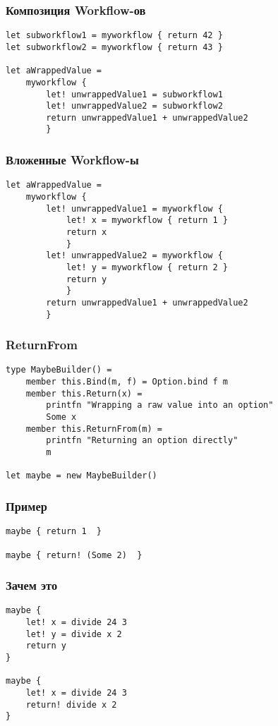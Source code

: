 \documentclass[xetex,mathserif,serif]{beamer}
\begin{document}
	\begin{frame}[fragile]
		\frametitle{Композиция Workflow-ов}
		\begin{verbatim}
let subworkflow1 = myworkflow { return 42 }
let subworkflow2 = myworkflow { return 43 }

let aWrappedValue = 
    myworkflow {
        let! unwrappedValue1 = subworkflow1
        let! unwrappedValue2 = subworkflow2
        return unwrappedValue1 + unwrappedValue2
        }
		\end{verbatim}
	\end{frame}

	\begin{frame}[fragile]
		\frametitle{Вложенные Workflow-ы}
		\begin{verbatim}
let aWrappedValue = 
    myworkflow {
        let! unwrappedValue1 = myworkflow {
            let! x = myworkflow { return 1 }
            return x
            }
        let! unwrappedValue2 = myworkflow {
            let! y = myworkflow { return 2 }
            return y
            }
        return unwrappedValue1 + unwrappedValue2
        }
		\end{verbatim}
	\end{frame}

	\begin{frame}[fragile]
		\frametitle{ReturnFrom}
		\begin{verbatim}
type MaybeBuilder() =
    member this.Bind(m, f) = Option.bind f m
    member this.Return(x) = 
        printfn "Wrapping a raw value into an option"
        Some x
    member this.ReturnFrom(m) = 
        printfn "Returning an option directly"
        m

let maybe = new MaybeBuilder()
		\end{verbatim}
	\end{frame}

	\begin{frame}[fragile]
		\frametitle{Пример}
		\begin{verbatim}
maybe { return 1  }

maybe { return! (Some 2)  }
		\end{verbatim}
	\end{frame}

	\begin{frame}[fragile]
		\frametitle{Зачем это}
		\begin{verbatim}
maybe {
    let! x = divide 24 3
    let! y = divide x 2
    return y 
}

maybe {
    let! x = divide 24 3
    return! divide x 2  
}
		\end{verbatim}
	\end{frame}
\end{document}
